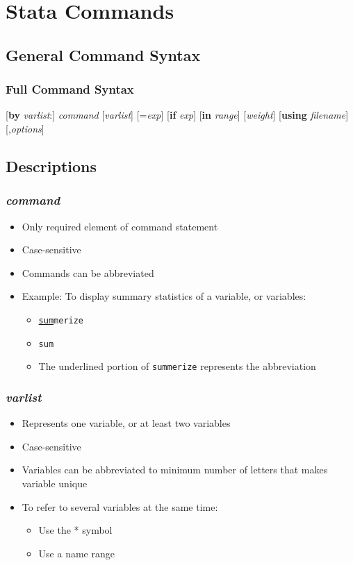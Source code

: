\documentclass{beamer}
\begin{document}
\section{Stata Commands}
\subsection{General Command Syntax}

\begin{frame}
	\frametitle{Full Command Syntax}
		{\tiny [\textbf{by} \textit{varlist}:] \textit{command} [\textit{varlist}] [=\textit{exp}] [\textbf{if} \textit{exp}] [\textbf{in} \textit{range}] [\textit{weight}] [\textbf{using} \textit{filename}] [,\textit{options}]}
\end{frame}

\subsection{Descriptions}

\begin{frame}
	\frametitle{\textit{command}}
		\begin{itemize}
			\item Only required element of command statement
			\item Case-sensitive
			\item Commands can be abbreviated
			\item Example: To display summary statistics of a variable, or variables:
			\begin{itemize}
				\item \texttt{\underline{sum}merize}
				\item \texttt{sum}
				\item The underlined portion of \texttt{summerize} represents the abbreviation
			\end{itemize}
		\end{itemize}
\end{frame}

\begin{frame}
	\frametitle{\textit{varlist}}
		\begin{itemize}
			\item Represents one variable, or at least two variables
			\item Case-sensitive
			\item Variables can be abbreviated to minimum number of letters that makes variable unique
			\item To refer to several variables at the same time:
				\begin{itemize}
					\item Use the * symbol
					\item Use a name range
				\end{itemize}
		\end{itemize}
\end{frame}
\end{document}
